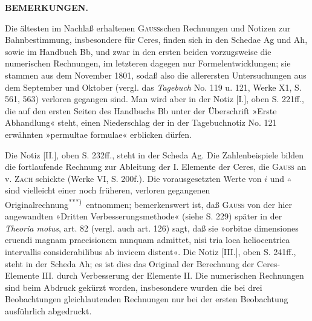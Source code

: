 \clearpage
\begingroup
{}
\makeatletter\tagsleft@true\let\veqno\leqno\makeatother
\begin{center}\textbf{BEMERKUNGEN.}\end{center}
\noindent\hspace*{\parindent}Die ältesten im Nachlaß erhaltenen \textsc{Gauss}schen Rechnungen und Notizen zur Bahnbestimmung, insbesondere für Ceres, finden sich in den Schedae Ag und Ah, sowie im Handbuch Bb, und zwar in den ersten beiden vorzugsweise die numerischen Rechnungen, im letzteren dagegen nur Formelentwicklungen; sie stammen aus dem November 1801, sodaß also die allerersten Untersuchungen aus dem September und Oktober (vergl. das \textit{Tagebuch} No. 119 u. 121, Werke X1, S. 561, 563) verloren gegangen sind. Man wird aber in der Notiz [I.], oben S. 221ff., die auf den ersten Seiten des Handbuchs Bb unter der Überschrift »Erste Abhandlung« steht, einen Niederschlag der in der Tagebuchnotiz No. 121 erwähnten »permultae formulae« erblicken dürfen.

Die Notiz [II.], oben S. 232ff., steht in der Scheda Ag. Die Zahlenbeispiele bilden die fortlaufende Rechnung zur Ableitung der I. Elemente der Ceres, die \textsc{Gauss} an v. \textsc{Zach} schickte (Werke VI, S. 200f.). Die vorausgesetzten Werte von $i$ und $\AstNode$ sind vielleicht einer noch früheren, verloren gegangenen Originalrechnung\textsuperscript{***)}\begingroup\renewcommand{\thefootnote}{***)}\endgroup\ entnommen; bemerkenswert ist, daß \textsc{Gauss} von der hier angewandten »Dritten Verbesserungsmethode« (siehe S. 229) später in der \textit{Theoria motus}, art. 82 (vergl. auch art. 126) sagt, daß sie »orbitae dimensiones eruendi magnam praecisionem nunquam admittet, nisi tria loca heliocentrica intervallis considerabilibus ab invicem distent«.
\clearpage
{}
Die Notiz [III.], oben S. 241ff., steht in der Scheda Ah; es ist dies das Original der Berechnung der Ceres-Elemente III. durch Verbesserung der Elemente II. Die numerischen Rechnungen sind beim Abdruck gekürzt worden, insbesondere wurden die bei drei Beobachtungen gleichlautenden Rechnungen nur bei der ersten Beobachtung ausführlich abgedruckt.

